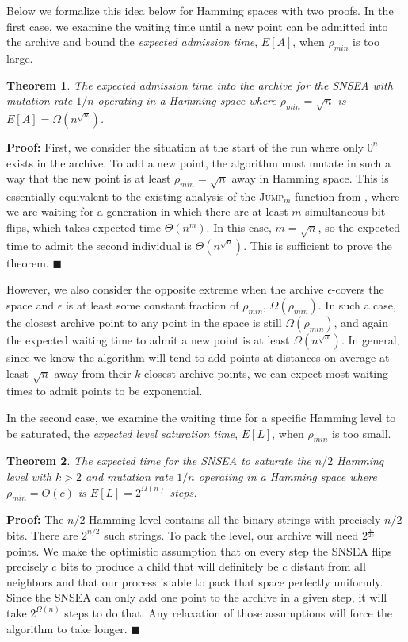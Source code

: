 \documentclass[twoside]{article}
\newtheorem{theorem}{Theorem}
\begin{document}
Below we formalize this idea below for Hamming spaces with two proofs.  In the first case, we examine the waiting time until a new point can be admitted into the archive and bound the \emph{expected admission time}, $E[A]$, when $\rho_{min}$ is too large.  

\begin{theorem}
The expected admission time into the archive for the SNSEA with mutation rate $1/n$ operating in a Hamming space where $\rho_{min} = \sqrt{n}$ is $E[A] = \Omega(n^{\sqrt{n}})$.
\end{theorem}
\textbf{Proof:} First, we consider the situation at the start of the run where only $0^n$ exists in the archive.  To add a new point, the algorithm must mutate in such a way that the new point is at least $\rho_{min} = \sqrt{n}$ away in Hamming space.  This is essentially equivalent to the existing analysis of the \textsc{Jump}$_m$ function from \citep{Droste2003}, where we are waiting for a generation in which there are at least $m$ simultaneous bit flips, which takes expected time $\Theta(n^m)$.  In this case, $m = \sqrt{n}$, so the expected time to admit the second individual is $\Theta(n^{\sqrt{n}})$.  This is sufficient to prove the theorem. $\blacksquare$

\vspace*{1ex}

However, we also consider the opposite extreme when the archive $\epsilon$-covers the space and $\epsilon$ is at least some constant fraction of $\rho_{min}$, $\Omega(\rho_{min})$.  In such a case, the closest archive point to any point in the space is still $\Omega(\rho_{min})$, and again the expected waiting time to admit a new point is at least $\Omega(n^{\sqrt{n}})$.  In general, since we know the algorithm will tend to add points at distances on average at least $\sqrt{n}$ away from their $k$ closest archive points, we can expect most waiting times to admit points to be exponential.



In the second case, we examine the waiting time for a specific Hamming level to be saturated, the \emph{expected level saturation time}, $E[L]$, when $\rho_{min}$ is too small.

\begin{theorem}
The expected time for the SNSEA to saturate the $n/2$ Hamming level with $k>2$ and mutation rate $1/n$ operating in a Hamming space where $\rho_{min} = O(c)$ is $E[L] = 2^{\Omega(n)}$ steps.
\end{theorem}
\textbf{Proof:} The $n/2$ Hamming level contains all the binary strings with precisely $n/2$ bits.  There are $2^{n/2}$ such strings.  To pack the level, our archive will need $2^\frac{n}{2c}$ points.  We make the optimistic assumption that on every step the SNSEA flips precisely $c$ bits to produce a child that will definitely be $c$ distant from all neighbors and that our process is able to pack that space perfectly uniformly.  Since the SNSEA can only add one point to the archive in a given step, it will take $2^{\Omega(n)}$ steps to do that. Any relaxation of those assumptions will force the algorithm to take longer. $\blacksquare$
\end{document}
